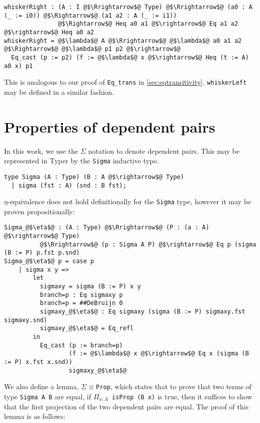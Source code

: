 \documentclass[12pt,twoside,maitrise]{dms}
\theoremstyle{definition}
\numberwithin{equation}{section}
\numberwithin{table}{chapter}
\numberwithin{figure}{chapter}
\newcommand\id[1] {\texttt{#1}}
\newcommand\fn[1] {\texttt{#1}}
\begin{document}
\begin{verbatim}
whiskerRight : (A : I @$\Rrightarrow$@ Type) @$\Rrightarrow$@ (a0 : A (_ := i0)) @$\Rightarrow$@ (a1 a2 : A (_ := i1))
               @$\Rightarrow$@ Heq a0 a1 @$\rightarrow$@ Eq a1 a2 @$\rightarrow$@ Heq a0 a2
whiskerRight = @$\lambda$@ A @$\Rrightarrow$@ @$\lambda$@ a0 a1 a2 @$\Rightarrow$@ @$\lambda$@ p1 p2 @$\rightarrow$@
  Eq_cast (p := p2) (f := @$\lambda$@ x @$\rightarrow$@ Heq (t := A) a0 x) p1
\end{verbatim}


This is analogous to our proof of \id{Eq\_trans} in
\autoref{sec:eqtransitivity}. \id{whiskerLeft} may be defined in a similar
fashion.

\section{Properties of dependent pairs}\label{app:deppairs-properties}
In this work, we use the $\Sigma$ notation to denote dependent pairs. This may
be represented in Typer by the \id{Sigma} inductive type.


\begin{verbatim}
type Sigma (A : Type) (B : A @$\rightarrow$@ Type)
  | sigma (fst : A) (snd : B fst);
\end{verbatim}

$\eta$-equivalence does not hold definitionally for the \id{Sigma} type, however
it may be proven propositionally:

\begin{verbatim}
Sigma_@$\eta$@ : (A : Type) @$\Rrightarrow$@ (P : (a : A) @$\rightarrow$@ Type)
          @$\Rrightarrow$@ (p : Sigma A P) @$\rightarrow$@ Eq p (sigma (B := P) p.fst p.snd)
Sigma_@$\eta$@ p = case p
    | sigma x y =>
        let
          sigmaxy = sigma (B := P) x y
          branch=p : Eq sigmaxy p
          branch=p = ##DeBruijn 0
          sigmaxy_@$\eta$@ : Eq sigmaxy (sigma (B := P) sigmaxy.fst sigmaxy.snd)
          sigmaxy_@$\eta$@ = Eq_refl
        in
          Eq_cast (p := branch=p)
                  (f := @$\lambda$@ x @$\rightarrow$@ Eq x (sigma (B := P) x.fst x.snd))
                  sigmaxy_@$\eta$@
\end{verbatim}

We also define a lemma, \id{$\Sigma${}$\equiv${}Prop}, which states that to
prove that two terms of type \fn{Sigma A B} are equal, if \fn{$\Pi_{x \colon A}$ isProp
  (B x)} is true, then it suffices to show that the first projection of the two
dependent pairs are equal. The proof of this lemma is as follows:
\end{document}
